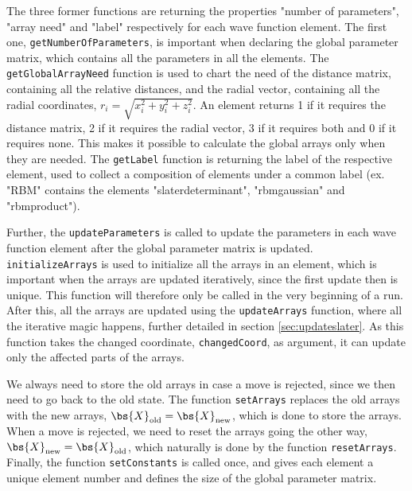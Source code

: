 The three former functions are returning the properties "number of parameters", "array need" and "label" respectively for each wave function element. The first one, \lstinline{getNumberOfParameters}, is important when declaring the global parameter matrix, which contains all the parameters in all the elements. The \lstinline{getGlobalArrayNeed} function is used to chart the need of the distance matrix, containing all the relative distances, and the radial vector, containing all the radial coordinates, $r_i=\sqrt{x_i^2+y_i^2+z_i^2}$. An element returns 1 if it requires the distance matrix, 2 if it requires the radial vector, 3 if it requires both and 0 if it requires none. This makes it possible to calculate the global arrays only when they are needed. The \lstinline{getLabel} function is returning the label of the respective element, used to collect a composition of elements under a common label (ex. "RBM" contains the elements "slaterdeterminant", "rbmgaussian" and "rbmproduct").

Further, the \lstinline{updateParameters} is called to update the parameters in each wave function element after the global parameter matrix is updated. \lstinline{initializeArrays} is used to initialize all the arrays in an element, which is important when the arrays are updated iteratively, since the first update then is unique. This function will therefore only be called in the very beginning of a run. After this, all the arrays are updated using the \lstinline{updateArrays} function, where all the iterative magic happens, further detailed in section \ref{sec:updateslater}. As this function takes the changed coordinate, \lstinline{changedCoord}, as argument, it can update only the affected parts of the arrays. 

We always need to store the old arrays in case a move is rejected, since we then need to go back to the old state. The function \lstinline{setArrays} replaces the old arrays with the new arrays, $\bs{X}_{\text{old}}=\bs{X}_{\text{new}}$, which is done to store the arrays. When a move is rejected, we need to reset the arrays going the other way, $\bs{X}_{\text{new}}=\bs{X}_{\text{old}}$, which naturally is done by the function \lstinline{resetArrays}. Finally, the function \lstinline{setConstants} is called once, and gives each element a unique element number and defines the size of the global parameter matrix. 

